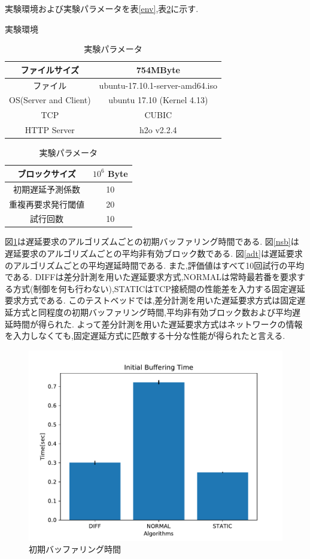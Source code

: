 \documentclass[a4j,12pt]{gradthesis_utf8}
\begin{document}
実験環境および実験パラメータを表\ref{env},表\ref{param}に示す.

\begin{table}[htb]
	\begin{center}
		\caption{実験環境}
		\label{env}
		\begin{tabular}{|c|c|} \hline
			ファイルサイズ & 754MByte\\ \hline
			ファイル &  ubuntu-17.10.1-server-amd64.iso\\ \hline
			OS(Server and Client) & ubuntu 17.10 (Kernel 4.13)\\ \hline
			TCP & CUBIC \\ \hline
			HTTP Server & h2o v2.2.4 \\ \hline
		\end{tabular}
		\caption{実験パラメータ}
		\label{param}
		\begin{tabular}{|c|c|} \hline
			ブロックサイズ & \(10^6\) Byte\\ \hline
			初期遅延予測係数 & 10 \\ \hline
			重複再要求発行閾値 & 20 \\ \hline
			試行回数 & 10 \\ \hline
		\end{tabular}
	\end{center}
\end{table}

図\ref{ibt}は遅延要求のアルゴリズムごとの初期バッファリング時間である.
図\ref{nsb}は遅延要求のアルゴリズムごとの平均非有効ブロック数である.
図\ref{adt}は遅延要求のアルゴリズムごとの平均遅延時間である.
また,評価値はすべて10回試行の平均である.
DIFFは差分計測を用いた遅延要求方式,NORMALは常時最若番を要求する方式(制御を何も行わない),STATICはTCP接続間の性能差を入力する固定遅延要求方式である.
このテストベッドでは,差分計測を用いた遅延要求方式は固定遅延方式と同程度の初期バッファリング時間,平均非有効ブロック数および平均遅延時間が得られた.
よって差分計測を用いた遅延要求方式はネットワークの情報を入力しなくても,固定遅延方式に匹敵する十分な性能が得られたと言える.

\begin{figure}[h]
	\centering
	\includegraphics[width=14cm]{figure/InitialBufferingTime.pdf}
	\caption{初期バッファリング時間}
	\label{ibt}
\end{figure}
\end{document}
